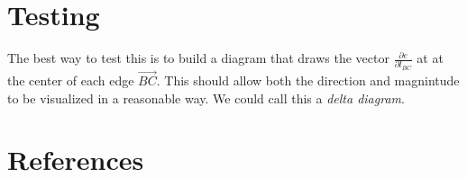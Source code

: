 \documentclass[11pt]{article}
\begin{document}
\section{Testing}

The best way to test this is to build a diagram that draws the vector $\frac{\partial e}{\partial l_{BC}}$ at at the center
of each edge $\vec{BC}$. This should allow both the direction and magnintude to be visualized in a reasonable way.
We could call this a {\em delta diagram}.

  


\section{References}
\end{document}
